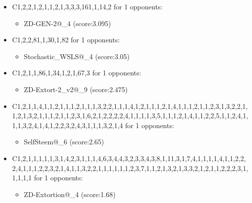 \begin{appendices}
\begin{itemize}
        \item C1,2,2,1,2,1,1,2,1,3,3,3,161,1,14,2 for 1 opponents:
        \begin{multicols}{3}
            \begin{itemize}
                \item ZD-GEN-2@\_4 (score:3.095)
            \end{itemize}
        \end{multicols}

        \item C1,2,2,81,1,30,1,82 for 1 opponents:
        \begin{multicols}{3}
            \begin{itemize}
                \item Stochastic\_WSLS@\_4 (score:3.05)
            \end{itemize}
        \end{multicols}

        \item C1,2,1,1,86,1,34,1,2,1,67,3 for 1 opponents:
        \begin{multicols}{3}
            \begin{itemize}
                \item ZD-Extort-2\_v2@\_9 (score:2.475)
            \end{itemize}
        \end{multicols}

        \item C1,2,1,1,4,1,1,2,1,1,1,2,1,1,1,3,2,2,1,1,1,4,1,2,1,1,1,2,1,4,1,1,1,2,1,1,2,3,1,3,2,2,1,1,2,1,3,2,1,1,1,2,1,1,2,3,1,6,2,1,2,2,2,2,4,1,1,1,1,3,5,1,1,1,2,1,4,1,1,2,2,5,1,1,2,4,1,1,1,3,2,4,1,4,1,2,2,3,2,4,3,1,1,1,3,2,1,4 for 1 opponents:
        \begin{multicols}{3}
            \begin{itemize}
                \item SelfSteem@\_6 (score:2.65)
            \end{itemize}
        \end{multicols}

        \item C1,2,1,1,1,1,1,3,1,4,2,3,1,1,1,4,6,3,4,4,3,2,3,3,4,3,8,1,11,3,1,7,4,1,1,1,1,4,1,1,2,2,2,4,1,1,1,2,2,3,2,1,4,1,1,3,2,2,1,1,1,1,1,1,2,3,7,1,1,2,1,3,2,1,3,3,2,1,2,1,1,2,2,2,3,1,1,1,1,1 for 1 opponents:
        \begin{multicols}{3}
            \begin{itemize}
                \item ZD-Extortion@\_4 (score:1.68)
            \end{itemize}
        \end{multicols}


\end{itemize}
\end{appendices}
